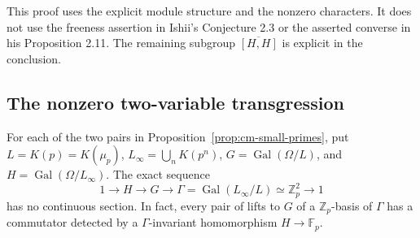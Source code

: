 This proof uses the explicit module structure and the
nonzero characters. It does not use the freeness assertion
in Ishii's Conjecture 2.3 or the asserted converse in his
Proposition 2.11. The remaining subgroup
\(\overline{[H,H]}\) is explicit in the conclusion.

\subsection{The nonzero two-variable transgression}

\begin{proposition}\label{prop:cm-nonsplit}
For each of the two pairs in Proposition~\ref{prop:cm-small-primes},
put \(L=K(p)=K(\mu_p)\), \(L_\infty=\bigcup_nK(p^n)\),
\(G=\operatorname{Gal}(\Omega/L)\), and
\(H=\operatorname{Gal}(\Omega/L_\infty)\).
The exact sequence
\[
 1\longrightarrow H\longrightarrow G\longrightarrow
 \Gamma=\operatorname{Gal}(L_\infty/L)\simeq\mathbb Z_p^2
 \longrightarrow1
\]
has no continuous section. In fact, every pair of lifts to \(G\)
of a \(\mathbb Z_p\)-basis of \(\Gamma\) has a commutator detected
by a \(\Gamma\)-invariant homomorphism \(H\to\mathbb F_p\).
\end{proposition}

